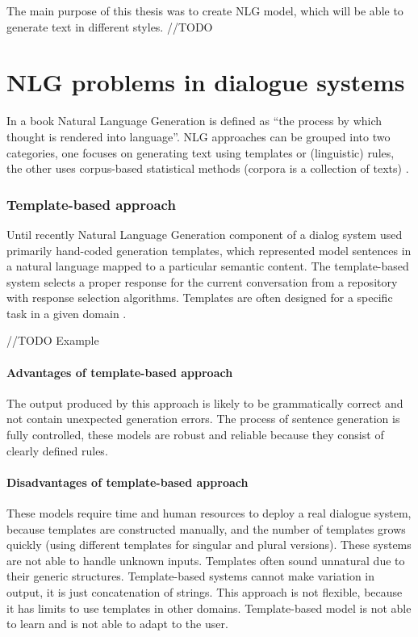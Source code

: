 The main purpose of this thesis was to create NLG model, which will be able to generate text in different styles.  //TODO


\chapter{NLG problems in dialogue systems}\label{nlg_problems}
In a book \cite{alder2017handbook} Natural Language Generation is defined as ``the process by which thought is rendered into language''. NLG approaches can be grouped into two categories, one focuses on generating text using templates or (linguistic) rules, the other uses corpus-based statistical methods (corpora is a collection of texts) \cite{oh2002stochastic}.

\subsection{Template-based approach} 
Until recently Natural Language Generation component of a dialog system used primarily hand-coded generation templates, which represented model sentences in a natural language mapped to a particular semantic content.
The template-based system selects a proper response for the current conversation from a repository with response selection algorithms. Templates are often designed for a specific task in a given domain \cite{manishina2016data}. 

//TODO Example 

\subsubsection{Advantages of template-based approach}
The output produced by this approach is likely to be grammatically correct and not contain unexpected generation errors. The process of sentence generation is fully controlled, these models are robust and reliable because they consist of clearly defined rules. 

\subsubsection{Disadvantages of template-based approach}
These models require time and human resources to deploy a real dialogue system, because templates are constructed manually, and the number of templates grows quickly (using different templates for singular and plural versions). These systems are not able to handle unknown inputs. Templates often sound unnatural due to their generic structures. Template-based systems cannot make variation in output, it is just concatenation of strings. This approach is not flexible, because it has limits to use templates in other domains. Template-based model is not able to learn and is not able to adapt to the user.

